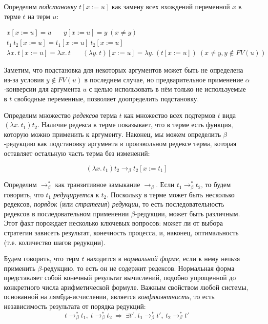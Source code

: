 \documentclass[../thesis.tex]{subfiles}
\begin{document}
Определим \textit{подстановку} $t [x := u]$ как замену всех вхождений переменной $x$ в терме $t$ на терм $u$:

\begin{equation}
\begin{gathered}
x [x := u] = u\ \ \ \ \ \ \ \ y [x := u] = y\ (x \neq y)\\t_1\ t_2 [x := u] = t_1 [x := u]\ t_2 [x := u]\\\lambda x.\, t [x := u] = \lambda x.\, t \ \ \ \ \ \ \ \ (\lambda y.\, t) [x := u] = \lambda y.\, (t [x := u])\ (x \neq y, y \notin FV(u))
\end{gathered}
\end{equation}

Заметим, что подстановка для некоторых аргументов может быть не определена из-за условия $y \notin FV(u)$ в последнем случае, но предварительное применение $\alpha$-конверсии для аргумента $u$ с целью использовать в нём только не используемые в $t$ свободные переменные, позволяет доопределить подстановку.

Определим множество \textit{редексов} терма $t$ как множество всех подтермов $t$ вида $(\lambda x.\, t_1) t_2$. Наличие редекса в терме показывает, что в терме есть функция, которую можно применить к аргументу. Наконец, мы можем определить $\beta$-редукцию как подстановку аргумента в произвольном редексе терма, которая оставляет остальную часть терма без изменений:

\begin{equation}
(\lambda x.\, t_1) t_2 \rightarrow_\beta t_2 [x := t_1]
\end{equation}

Определим $\rightarrow_\beta^*$ как транзитивное замыкание $\rightarrow_\beta$. Если $t_1 \rightarrow_\beta^* t_2$, то будем говорить, что $t_1$ \textit{редуцируется} к $t_2$. Поскольку в терме может быть несколько редексов, \textit{порядок} (или \textit{стратегия}) \textit{редукции}, то есть последовательность редексов в последовательном применении $\beta$-редукции, может быть различным. Этот факт порождает несколько ключевых вопросов: может ли от выбора стратегии зависеть результат, конечность процесса, и, наконец, оптимальность (т.е. количество шагов редукции).

Будем говорить, что терм $t$ находится в \textit{нормальной форме}, если к нему нельзя применить $\beta$-редукцию, то есть он не содержит редексов. Нормальная форма представляет собой конечный результат вычислений, подобно упрощенной до конкретного числа арифметической формуле. Важным свойством любой системы, основанной на лямбда-исчислении, является \textit{конфлюэнтность}, то есть независимость результата от порядка редукций:
\begin{equation}
t \rightarrow_\beta^* t_1,\ t \rightarrow_\beta^* t_2 \ \Rightarrow\ \exists t'.\ t_1 \rightarrow_\beta^* t',\ t_2 \rightarrow_\beta^* t'
\end{equation}
\end{document}
